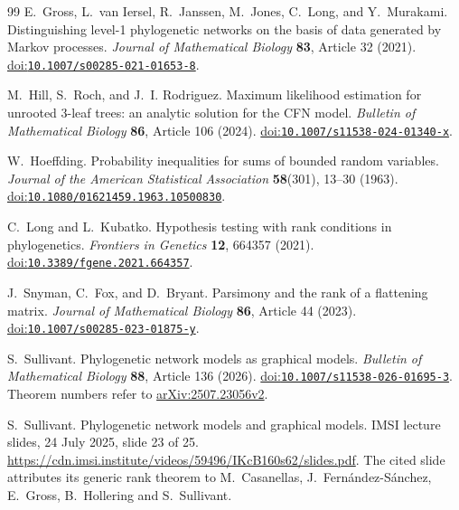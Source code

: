 \documentclass[11pt]{article}
\theoremstyle{definition}
\theoremstyle{remark}
\newcommand{\doi}[1]{\href{https://doi.org/#1}{doi:\nolinkurl{#1}}}
\begin{document}
\begin{thebibliography}{99}
E.~Gross, L.~van Iersel, R.~Janssen, M.~Jones, C.~Long, and Y.~Murakami.
Distinguishing level-1 phylogenetic networks on the basis of data generated
by Markov processes.
\emph{Journal of Mathematical Biology} \textbf{83}, Article 32 (2021).
\doi{10.1007/s00285-021-01653-8}.

M.~Hill, S.~Roch, and J.~I. Rodriguez.
Maximum likelihood estimation for unrooted 3-leaf trees: an analytic
solution for the CFN model.
\emph{Bulletin of Mathematical Biology} \textbf{86}, Article 106 (2024).
\doi{10.1007/s11538-024-01340-x}.

W.~Hoeffding.
Probability inequalities for sums of bounded random variables.
\emph{Journal of the American Statistical Association} \textbf{58}(301),
13--30 (1963). \doi{10.1080/01621459.1963.10500830}.

C.~Long and L.~Kubatko.
Hypothesis testing with rank conditions in phylogenetics.
\emph{Frontiers in Genetics} \textbf{12}, 664357 (2021).
\doi{10.3389/fgene.2021.664357}.

J.~Snyman, C.~Fox, and D.~Bryant.
Parsimony and the rank of a flattening matrix.
\emph{Journal of Mathematical Biology} \textbf{86}, Article 44 (2023).
\doi{10.1007/s00285-023-01875-y}.

S.~Sullivant.
Phylogenetic network models as graphical models.
\emph{Bulletin of Mathematical Biology} \textbf{88}, Article 136 (2026).
\doi{10.1007/s11538-026-01695-3}.
Theorem numbers refer to
\href{https://arxiv.org/abs/2507.23056v2}{arXiv:2507.23056v2}.

S.~Sullivant.
Phylogenetic network models and graphical models.
IMSI lecture slides, 24 July 2025, slide 23 of 25.
\url{https://cdn.imsi.institute/videos/59496/IKcB160s62/slides.pdf}.
The cited slide attributes its generic rank theorem to M.~Casanellas,
J.~Fern\'andez-S\'anchez, E.~Gross, B.~Hollering and S.~Sullivant.

\end{thebibliography}
\end{document}
